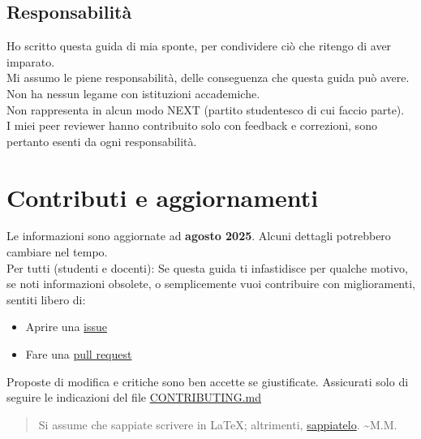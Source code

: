 \documentclass{article}
\begin{document}
\subsection{Responsabilità}
Ho scritto questa guida di mia sponte, per condividere ciò che ritengo di aver imparato.\\
Mi assumo le piene responsabilità, delle conseguenza che questa guida può avere.\\
Non ha nessun legame con istituzioni accademiche.\\
Non rappresenta in alcun modo NEXT (partito studentesco di cui faccio parte).\\
I miei peer reviewer hanno contribuito solo con feedback e correzioni, sono pertanto esenti da ogni responsabilità.\\


\section{Contributi e aggiornamenti}
Le informazioni sono aggiornate ad \textbf{agosto 2025}. Alcuni dettagli potrebbero cambiare nel tempo.\\
Per tutti (studenti e docenti): Se questa guida ti infastidisce per qualche motivo, se noti informazioni obsolete, o semplicemente vuoi contribuire con miglioramenti, sentiti libero di:
\begin{itemize}
    \item Aprire una \href{https://github.com/Verryx-02/Scuola-di-sopravvivenza-per-studenti-di-Informatica/issues}{issue}
    \item Fare una \href{https://github.com/Verryx-02/Scuola-di-sopravvivenza-per-studenti-di-Informatica/pulls}{pull request}
\end{itemize}
Proposte di modifica e critiche sono ben accette se giustificate. Assicurati solo di seguire le indicazioni del file \href{https://github.com/Verryx-02/Scuola-di-sopravvivenza-per-studenti-di-Informatica/blob/main/CONTRIBUTING.md}{CONTRIBUTING.md}
\begin{quote}
Si assume che sappiate scrivere in \LaTeX; altrimenti, \href{https://www.learnlatex.org/it/}{sappiatelo}. \textasciitilde M.M.
\end{quote}
\end{document}
